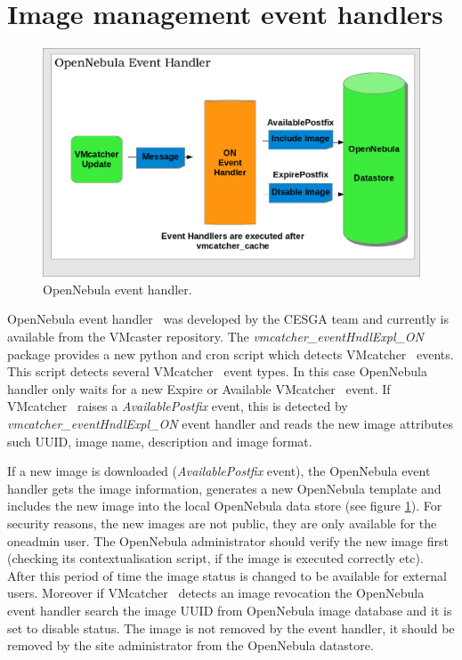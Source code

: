 \documentclass{llncs_Ibergrid2013}
\begin{document}
\section{Image management event handlers}
\label{sect-handlers}
\begin{figure}[h]
\centering
\includegraphics[width=1\textwidth]{ONeventhandler.png}
\caption{OpenNebula event handler.}
\label{fig:onevent}
\end{figure}
OpenNebula event handler~\cite{onevent} was developed by the CESGA team and currently is available from the VMcaster repository. 
The \textit{vmcatcher\_eventHndlExpl\_ON} package provides a new python and cron script which detects VMcatcher~\cite{vmcatcher} events. 
This script detects several VMcatcher~\cite{vmcatcher} event types. In this case OpenNebula handler only waits for a new Expire or Available VMcatcher~\cite{vmcatcher} event.
If VMcatcher~\cite{vmcatcher} raises a \textit{AvailablePostfix} event, this is detected by \textit{vmcatcher\_eventHndlExpl\_ON} event handler and reads the new image attributes such UUID, image name, description and image format.

If a new image is downloaded (\textit{AvailablePostfix} event), the OpenNebula event handler gets the image information, generates a new OpenNebula template and includes the new image into the local OpenNebula data store (see figure \ref{fig:onevent}). 
For security reasons, the new images are not public, they are only available for the oneadmin user. The OpenNebula administrator should verify the new image first (checking its contextualisation script, if the image is executed correctly etc).
After this period of time the image status is changed to be available for external users. 
Moreover if VMcatcher~\cite{vmcatcher} detects an image revocation the OpenNebula event handler search the image UUID from OpenNebula image database and it is set to disable status.
The image is not removed by the event handler, it should be removed by the site administrator from the OpenNebula datastore.
\end{document}
